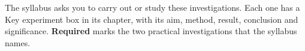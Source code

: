 \label{kx:chap}

\newcommand\kxhead{\colhead{Experiment} & \colhead{What was done} & \colhead{What it showed} &
  \colhead{Ch.}}
\newcommand\kxrow[5]{\textbf{#1}\newline{\footnotesize\color{hscmuted}#2} & #3 & #4 &
  \hyperref[ch#5:chap]{\textbf{#5}}\\\hline}

The syllabus asks you to carry out or study these investigations. Each one has a Key
experiment box in its chapter, with its aim, method, result, conclusion and significance.
\textbf{Required} marks the two practical investigations that the syllabus names.

